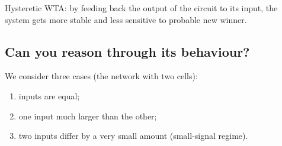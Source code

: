 Hysteretic WTA: by feeding back the output of the circuit to its input, the system gets more stable and less sensitive to probable new winner.

\subsection{Can you reason through its behaviour?}
We consider three cases (the network with two cells): 

\begin{enumerate}[label={I.}]
\item inputs are equal; 
\item one input much larger than the other; 
\item two inputs differ by a very small amount (small-signal regime).
\end{enumerate}

